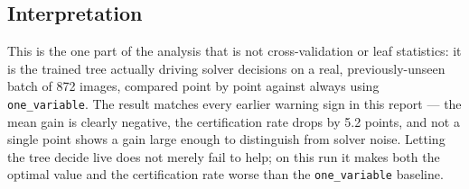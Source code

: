 \documentclass[11pt,a4paper]{article}
\begin{document}
\subsection{Interpretation}
This is the one part of the analysis that is not cross-validation or leaf statistics: it is the trained tree actually driving solver decisions on a real, previously-unseen batch of 872 images, compared point by point against always using \texttt{one\_variable}. The result matches every earlier warning sign in this report --- the mean gain is clearly negative, the certification rate drops by 5.2 points, and not a single point shows a gain large enough to distinguish from solver noise. Letting the tree decide live does not merely fail to help; on this run it makes both the optimal value and the certification rate worse than the \texttt{one\_variable} baseline.
\end{document}
